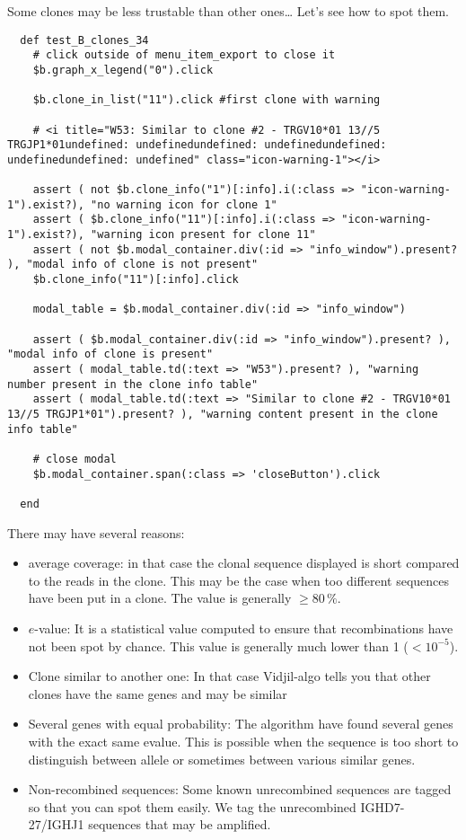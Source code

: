 Some clones may be less trustable than other ones\dots{} Let's see how to spot them.
\begin{verbatim}
  def test_B_clones_34
    # click outside of menu_item_export to close it
    $b.graph_x_legend("0").click

    $b.clone_in_list("11").click #first clone with warning

    # <i title="W53: Similar to clone #2 - TRGV10*01 13//5 TRGJP1*01undefined: undefinedundefined: undefinedundefined: undefinedundefined: undefined" class="icon-warning-1"></i>

    assert ( not $b.clone_info("1")[:info].i(:class => "icon-warning-1").exist?), "no warning icon for clone 1"
    assert ( $b.clone_info("11")[:info].i(:class => "icon-warning-1").exist?), "warning icon present for clone 11"
    assert ( not $b.modal_container.div(:id => "info_window").present? ), "modal info of clone is not present"
    $b.clone_info("11")[:info].click

    modal_table = $b.modal_container.div(:id => "info_window")
    
    assert ( $b.modal_container.div(:id => "info_window").present? ), "modal info of clone is present"
    assert ( modal_table.td(:text => "W53").present? ), "warning number present in the clone info table"
    assert ( modal_table.td(:text => "Similar to clone #2 - TRGV10*01 13//5 TRGJP1*01").present? ), "warning content present in the clone info table"

    # close modal
    $b.modal_container.span(:class => 'closeButton').click

  end
\end{verbatim}

There may have several reasons: 
\begin{itemize}
\item average coverage: in that case the clonal sequence displayed is short
  compared to the reads in the clone. This may be the case when too different
  sequences have been put in a clone. The value is generally $\geq 80\,\%$.
\item $e$-value: It is a statistical value computed to ensure that
  recombinations have not been spot by chance. This value is generally much
  lower than 1 ($<10^{-5}$).
\item Clone similar to another one: In that case Vidjil-algo tells you that
  other clones have the same genes and may be similar
\item Several genes with equal probability: The algorithm have found several genes with the exact same evalue. This is possible when the sequence is too short to distinguish between allele or sometimes between various similar genes.
\item Non-recombined sequences: Some known unrecombined sequences are tagged
  so that you can spot them easily. We tag the unrecombined IGHD7-27/IGHJ1
  sequences that may be amplified.
\end{itemize}


